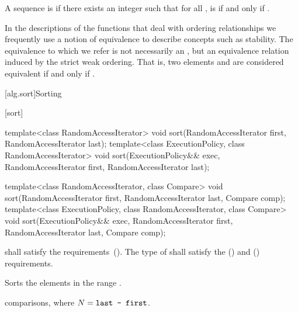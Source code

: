 \pnum
A sequence
is
if there exists an integer
such that for all
,
is  if and only if
.

\pnum
In the descriptions of the functions that deal with ordering relationships we frequently use a notion of
equivalence to describe concepts such as stability.
The equivalence to which we refer is not necessarily an
,
but an equivalence relation induced by the strict weak ordering.
That is, two elements
and
are considered equivalent if and only if
.

[alg.sort]{Sorting}

[sort]{}

%
\begin{itemdecl}
template<class RandomAccessIterator>
  void sort(RandomAccessIterator first, RandomAccessIterator last);
template<class ExecutionPolicy, class RandomAccessIterator>
  void sort(ExecutionPolicy&& exec,
            RandomAccessIterator first, RandomAccessIterator last);

template<class RandomAccessIterator, class Compare>
  void sort(RandomAccessIterator first, RandomAccessIterator last,
            Compare comp);
template<class ExecutionPolicy, class RandomAccessIterator, class Compare>
  void sort(ExecutionPolicy&& exec,
            RandomAccessIterator first, RandomAccessIterator last,
            Compare comp);
\end{itemdecl}

\begin{itemdescr}
\pnum
\requires
{} shall satisfy the
 requirements~(). The type
of  shall satisfy the
 () and
 () requirements.

\pnum
\effects
Sorts the elements in the range
.

\pnum
\complexity
{} comparisons, where $N = \texttt{last - first}$.
\end{itemdescr}

